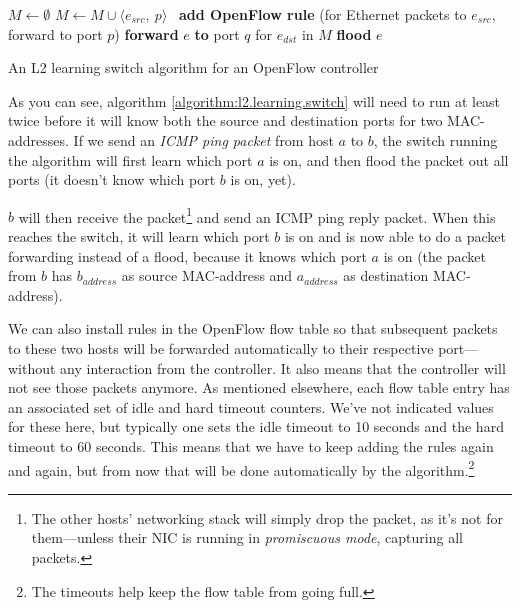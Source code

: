 \begin{algorithm}
  \begin{algorithmic}
    \State $M \gets \emptyset$
    \State
      \State $M \gets M \cup \langle e_{src},\ p \rangle$ 
      \State
      \State \textbf{add OpenFlow rule }(for Ethernet packets to
        $e_{src}$, forward to port $p$)
      \State
        \State \textbf{forward} $e$ \textbf{to} port $q$ for $e_{dst}$ in $M$
      \Else
        \State \textbf{flood} $e$ 
      \EndIf
    \EndOn
  \end{algorithmic}
  \caption{An L2 learning switch algorithm for an OpenFlow controller}
  \label{algorithm:l2.learning.switch}
\end{algorithm}

As you can see, algorithm \ref{algorithm:l2.learning.switch} will need to
run at least twice before it will know both the source and destination ports
for two MAC-addresses.  If we send an \textit{\acs{ICMP} ping
packet} from host $a$ to $b$, the switch running the algorithm
will first learn which port $a$ is on, and then flood the packet out all
ports (it doesn't know which port $b$ is on, yet).

$b$ will then receive the packet\footnote{The other hosts' networking stack
will simply drop the packet, as it's not for them---unless their \ac{NIC}
is running in \textit{promiscuous mode}, capturing
all packets.} and send an \acs{ICMP} ping reply packet.  When this
reaches the switch, it will learn which port $b$ is on and is now able
to do a packet forwarding instead of a flood, because it knows which
port $a$ is on (the packet from $b$ has $b_{address}$ as source
MAC-address and $a_{address}$ as destination MAC-address).

We can also install rules in the OpenFlow flow table so that
subsequent packets to these two hosts will be forwarded automatically to
their respective port---without any interaction from the controller.  It
also means that the controller will not see those packets anymore.  As
mentioned elsewhere, each flow table entry has an associated set of idle and
hard timeout counters.  We've not indicated values for these here, but
typically one sets the idle timeout to 10 seconds and the
hard timeout to 60
seconds.  This means that we have to keep adding the rules again and again,
but from now that will be done automatically by the algorithm.\footnote{The
timeouts help keep the flow table from going full.}

